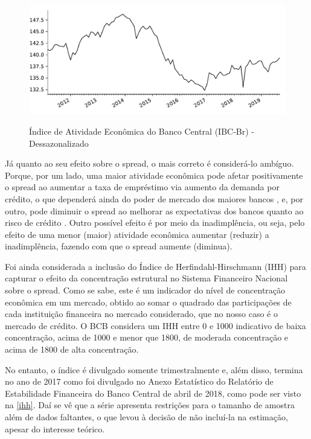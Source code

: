 \documentclass[a4paper,
               article,
               12pt,
               openany,
               oneside,
               english,
               brazil]{abntex2}
\numberwithin{equation}{section}
\begin{document}
    \begin{figure}[!hbt]
        \centering
        \caption{Índice de Atividade Econômica do Banco Central (IBC-Br) - Dessazonalizado}
        \includegraphics[width = \textwidth, scale=0.75]{ibc.pdf}
        \label{ibc}
    \end{figure}

    Já quanto ao seu efeito sobre o spread, o mais correto é considerá-lo ambíguo. Porque, por um lado, uma maior atividade econômica pode afetar positivamente o spread ao aumentar a taxa de empréstimo via aumento da demanda por crédito, o que dependerá ainda do poder de mercado dos maiores bancos \textcite[626]{oreiro}, e, por outro, pode diminuir o spread ao melhorar as expectativas dos bancos quanto ao risco de crédito \textcite[24]{chaim}. Outro possível efeito é por meio da inadimplência, ou seja, pelo efeito de uma menor (maior) atividade econômica aumentar (reduzir) a inadimplência, fazendo com que o spread aumente (diminua).

    Foi ainda considerada a inclusão do Índice de Herfindahl-Hirschmann (IHH) para capturar o efeito da concentração estrutural no Sistema Financeiro Nacional sobre o spread. Como se sabe, este é um indicador do nível de concentração econômica em um mercado, obtido ao somar o quadrado das participações de cada instituição financeira no mercado considerado, que no nosso caso é o mercado de crédito. O BCB considera um IHH entre 0 e 1000 indicativo de baixa concentração, acima de 1000 e menor que 1800, de moderada concentração e acima de 1800 de alta concentração.
    
    No entanto, o índice é divulgado somente trimestralmente e, além disso, termina no ano de 2017 como foi divulgado no Anexo Estatístico do Relatório de Estabilidade Financeira do Banco Central de abril de 2018, como pode ser visto na \autoref{ihh}. Daí se vê que a série apresenta restrições para o tamanho de amostra além de dados faltantes, o que levou à decisão de não incluí-la na estimação, apesar do interesse teórico.
\end{document}
